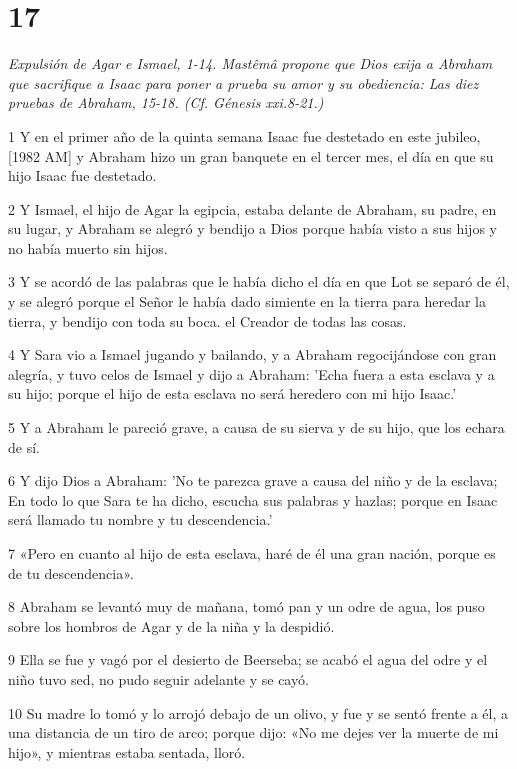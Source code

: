 \chapter{17}

\par \textit{Expulsión de Agar e Ismael, 1-14. Mastêmâ propone que Dios exija a Abraham que sacrifique a Isaac para poner a prueba su amor y su obediencia: Las diez pruebas de Abraham, 15-18. (Cf. Génesis xxi.8-21.)}

\par 1 Y en el primer año de la quinta semana Isaac fue destetado en este jubileo, [1982 AM] y Abraham hizo un gran banquete en el tercer mes, el día en que su hijo Isaac fue destetado.
\par 2 Y Ismael, el hijo de Agar la egipcia, estaba delante de Abraham, su padre, en su lugar, y Abraham se alegró y bendijo a Dios porque había visto a sus hijos y no había muerto sin hijos.
\par 3 Y se acordó de las palabras que le había dicho el día en que Lot se separó de él, y se alegró porque el Señor le había dado simiente en la tierra para heredar la tierra, y bendijo con toda su boca. el Creador de todas las cosas.
\par 4 Y Sara vio a Ismael jugando y bailando, y a Abraham regocijándose con gran alegría, y tuvo celos de Ismael y dijo a Abraham: 'Echa fuera a esta esclava y a su hijo; porque el hijo de esta esclava no será heredero con mi hijo Isaac.'
\par 5 Y a Abraham le pareció grave, a causa de su sierva y de su hijo, que los echara de sí.
\par 6 Y dijo Dios a Abraham: 'No te parezca grave a causa del niño y de la esclava; En todo lo que Sara te ha dicho, escucha sus palabras y hazlas; porque en Isaac será llamado tu nombre y tu descendencia.'
\par 7 «Pero en cuanto al hijo de esta esclava, haré de él una gran nación, porque es de tu descendencia».
\par 8 Abraham se levantó muy de mañana, tomó pan y un odre de agua, los puso sobre los hombros de Agar y de la niña y la despidió.
\par 9 Ella se fue y vagó por el desierto de Beerseba; se acabó el agua del odre y el niño tuvo sed, no pudo seguir adelante y se cayó.
\par 10 Su madre lo tomó y lo arrojó debajo de un olivo, y fue y se sentó frente a él, a una distancia de un tiro de arco; porque dijo: «No me dejes ver la muerte de mi hijo», y mientras estaba sentada, lloró.
